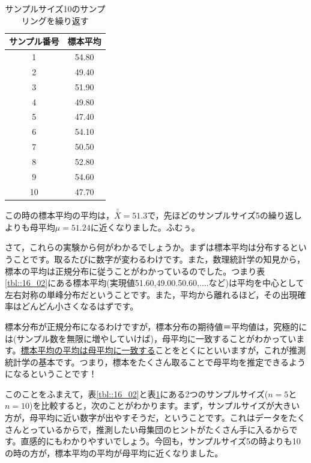 \documentclass{ltjsbook}
\begin{document}
\begin{table}[ht]
	\centering
	\caption{サンプルサイズ10のサンプリングを繰り返す}
	\begin{tabular}{cc}
		\hline
		サンプル番号 & 標本平均  \\
		\hline
		1      & 54.80 \\
		2      & 49.40 \\
		3      & 51.90 \\
		4      & 49.80 \\
		5      & 47.40 \\
		6      & 54.10 \\
		7      & 50.50 \\
		8      & 52.80 \\
		9      & 54.60 \\
		10     & 47.70 \\
		\hline
	\end{tabular}
	\label{tbl::16_03}
\end{table}

この時の標本平均の平均は，$\bar{\bar{X}}=51.3$で，先ほどのサンプルサイズ5の繰り返しよりも母平均$\mu=51.24$に近くなりました。ふむぅ。

さて，これらの実験から何がわかるでしょうか。まずは標本平均は分布するということです。取るたびに数字が変わるわけです。また，数理統計学の知見から，標本の平均は正規分布に従うことがわかっているのでした。つまり表\ref{tbl::16_02}にある標本平均(実現値51.60,49.00.50.60,....など)は平均を中心として左右対称の単峰分布だということです。また，平均から離れるほど，その出現確率はどんどん小さくなるはずです。

標本分布が正規分布になるわけですが，標本分布の期待値＝平均値は，究極的には(サンプル数を無限に増やしていけば)，母平均に一致することがわかっています。\underline{標本平均の平均は母平均に一致する}ことをとくにといいますが，これが推測統計学の基本です。つまり，標本をたくさん取ることで母平均を推定できるようになるということです！

このことをふまえて，表\ref{tbl::16_02}と表\ref{tbl::16_03}にある2つのサンプルサイズ($n=5$と$n=10$)を比較すると，次のことがわかります。まず，サンプルサイズが大きい方が，母平均に近い数字が出やすそうだ，ということです。これはデータをたくさんとっているからで，推測したい母集団のヒントがたくさん手に入るからです。直感的にもわかりやすいでしょう。今回も，サンプルサイズ5の時よりも10の時の方が，標本平均の平均が母平均に近くなりました。
\end{document}
